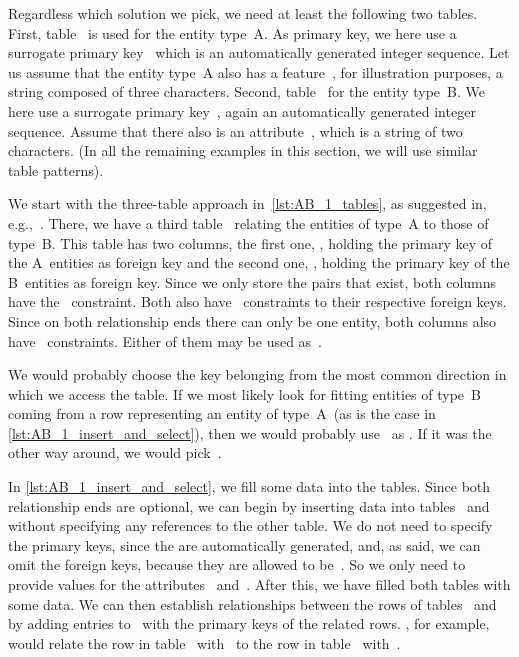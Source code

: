 %
Regardless which solution we pick, we need at least the following two tables.
First, table~ is used for the entity type~A.
As primary key, we here use a surrogate primary key~ which is an automatically generated integer sequence.
Let us assume that the entity type~A also has a feature~, for illustration purposes, a string composed of three characters.
Second, table~ for the entity type~B.
We here use a surrogate primary key~, again an automatically generated integer sequence.
Assume that there also is an attribute~, which is a string of two characters.
(In all the remaining examples in this section, we will use similar table patterns).

We start with the three-table approach in~\cref{lst:AB_1_tables}, as suggested in, e.g.,~\cite{S2024D:MEDTRDM}.
There, we have a third table~ relating the entities of type~A to those of type~B.
This table has two columns, the first one, , holding the primary key of the A~entities as foreign key and the second one, , holding the primary key of the B~entities as foreign key.
Since we only store the pairs that exist, both columns have the~ constraint.
Both also have~ constraints to their respective foreign keys.
Since on both relationship ends there can only be one entity, both columns also have ~constraints.
Either of them may be used as~.

We would probably choose the key belonging from the most common direction in which we access the table.
If we most likely look for fitting entities of type~B coming from a row representing an entity of type~A~(as is the case in \cref{lst:AB_1_insert_and_select}), then we would probably use~ as .
If it was the other way around, we would pick~.

In \cref{lst:AB_1_insert_and_select}, we fill some data into the tables.
Since both relationship ends are optional, we can begin by inserting data into tables~ and~ without specifying any references to the other table.
We do not need to specify the primary keys, since the are automatically generated, and, as said, we can omit the foreign keys, because they are allowed to be~.
So we only need to provide values for the attributes~ and~.
After this, we have filled both tables with some data.
We can then establish relationships between the rows of tables~ and~ by adding entries to~ with the primary keys of the related rows.
, for example, would relate the row in table~ with~ to the row in table~ with~.

